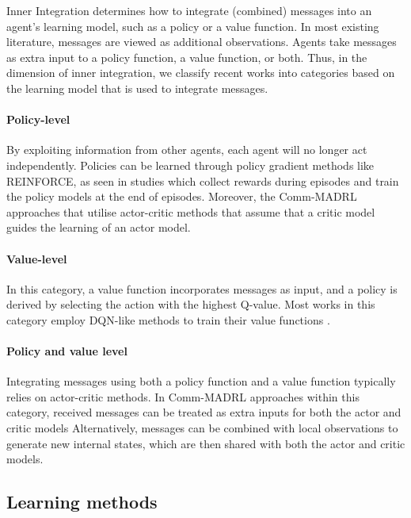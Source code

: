 \documentclass{article}
\begin{document}
Inner Integration determines how to integrate (combined) messages into an agent’s learning model, such as a policy or a value function. In most existing literature, messages are viewed as additional observations. Agents take messages as extra input to a policy function, a value function, or both. Thus, in the dimension of inner integration, we classify recent works into categories based on the learning model that is used to integrate messages.

\paragraph{Policy-level}
By exploiting information from other agents, each agent will no longer act independently. Policies can be learned through policy gradient methods like REINFORCE, as seen in studies \citet{sukhbaatar2016commnet, singh2018ic3net} which collect rewards during episodes and train the policy models at the end of episodes. Moreover, the Comm-MADRL approaches that utilise actor-critic methods \citep{gupta2022HAMMER} that assume that a critic model guides the learning of an actor model.

\paragraph{Value-level}
In this category, a value function incorporates messages as input, and a policy is derived by selecting the action with the highest Q-value. Most works in this category employ DQN-like methods to train their value functions \citep{foerster2016learning}.

\paragraph{Policy and value level}
Integrating messages using both a policy function and a value function typically relies on actor-critic methods. In Comm-MADRL approaches within this category, received messages can be treated as extra inputs for both the actor and critic models \citep{peng2017bicnet} Alternatively, messages can be combined with local observations to generate new internal states, which are then shared with both the actor and critic models.


\subsection{Learning methods}\label{sec:learning_methods}
\end{document}
